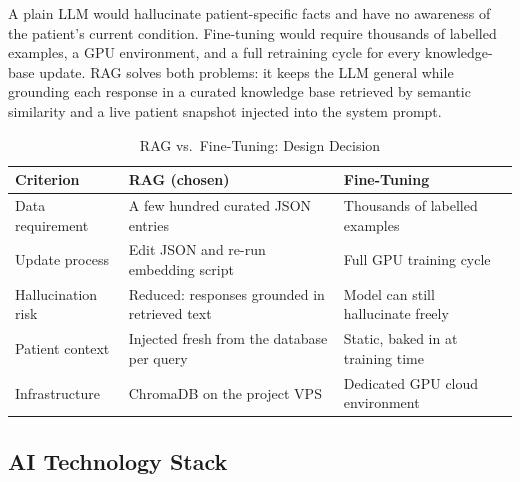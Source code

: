 \documentclass[12pt,a4paper]{report}
\begin{document}
A plain LLM would hallucinate patient-specific facts and have no awareness of the patient's current condition. Fine-tuning would require thousands of labelled examples, a GPU environment, and a full retraining cycle for every knowledge-base update. RAG solves both problems: it keeps the LLM general while grounding each response in a curated knowledge base retrieved by semantic similarity and a live patient snapshot injected into the system prompt.

\begin{table}[H]
\centering
\caption{RAG vs.\ Fine-Tuning: Design Decision}
\label{tab:rag_vs_ft}
\begin{tabularx}{\textwidth}{@{}lXX@{}}
\toprule
\textbf{Criterion}  & \textbf{RAG (chosen)}                      & \textbf{Fine-Tuning} \\
\midrule
Data requirement    & A few hundred curated JSON entries         & Thousands of labelled examples \\
Update process      & Edit JSON and re-run embedding script      & Full GPU training cycle \\
Hallucination risk  & Reduced: responses grounded in retrieved text & Model can still hallucinate freely \\
Patient context     & Injected fresh from the database per query & Static, baked in at training time \\
Infrastructure      & ChromaDB on the project VPS                & Dedicated GPU cloud environment \\
\bottomrule
\end{tabularx}
\end{table}

\subsection{AI Technology Stack}
\end{document}
